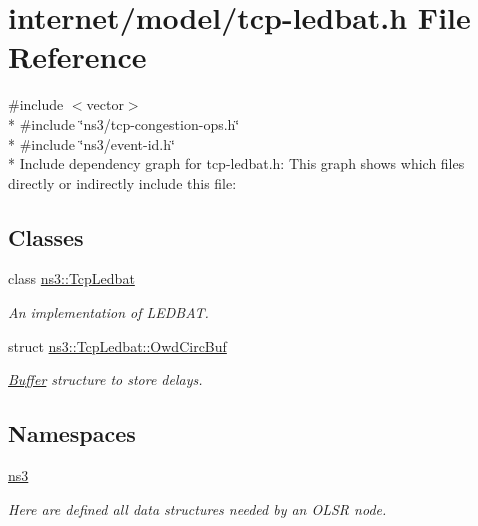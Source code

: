 \hypertarget{tcp-ledbat_8h}{}\section{internet/model/tcp-\/ledbat.h File Reference}
\label{tcp-ledbat_8h}
{\ttfamily \#include $<$vector$>$}\\*
{\ttfamily \#include \char`\"{}ns3/tcp-\/congestion-\/ops.\+h\char`\"{}}\\*
{\ttfamily \#include \char`\"{}ns3/event-\/id.\+h\char`\"{}}\\*
Include dependency graph for tcp-\/ledbat.h\+:
This graph shows which files directly or indirectly include this file\+:
\subsection*{Classes}
\begin{DoxyCompactItemize}
\item 
class \hyperlink{classns3_1_1TcpLedbat}{ns3\+::\+Tcp\+Ledbat}
\begin{DoxyCompactList}\small\item\em An implementation of L\+E\+D\+B\+AT. \end{DoxyCompactList}\item 
struct \hyperlink{structns3_1_1TcpLedbat_1_1OwdCircBuf}{ns3\+::\+Tcp\+Ledbat\+::\+Owd\+Circ\+Buf}
\begin{DoxyCompactList}\small\item\em \hyperlink{classns3_1_1Buffer}{Buffer} structure to store delays. \end{DoxyCompactList}\end{DoxyCompactItemize}
\subsection*{Namespaces}
\begin{DoxyCompactItemize}
\item 
 \hyperlink{namespacens3}{ns3}
\begin{DoxyCompactList}\small\item\em Here are defined all data structures needed by an O\+L\+SR node. \end{DoxyCompactList}\end{DoxyCompactItemize}
